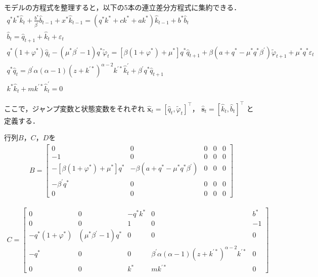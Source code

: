 \documentclass[dvipdfmx]{jlreq}
\begin{document}
モデルの方程式を整理すると，以下の5本の連立差分方程式に集約できる．
\begin{gather}
    q^* k^* \widehat{k}_t + \frac{b^*}{\beta^\prime} \widehat{b}_{t-1} + x^* \widehat{k}_{t-1} = (q^* k^* + c k^* + a k^*) \widehat{k}_{t-1} + b^* \widehat{b}_t \\
  \widehat{b}_t = \widehat{q}_{t+1} + \widehat{k}_t + \varepsilon_t \\
  q^*(1+\varphi^*) \widehat{q}_t - (\mu^* \beta^\prime - 1)q^* \widetilde{\varphi}_t = [\beta(1+\varphi^*) + \mu^*] q^* \widehat{q}_{t+1} + \beta(a+q^* - \mu^* q^* \beta^\prime) \widetilde{\varphi}_{t+1} + \mu^* q^* \varepsilon_t \\
  q^* \widehat{q}_t = \beta^\prime \alpha(\alpha-1)(z+k^{\prime *})^{\alpha-2} k^{\prime *} \widehat{k}^\prime_t + \beta^\prime q^* \widehat{q}_{t+1} \\
  k^* \widehat{k}_t + m k^{\prime *} \widehat{k}^\prime_t = 0
\end{gather}

ここで，ジャンプ変数と状態変数をそれぞれ
$\widehat{\boldsymbol{x}}_t = [\widehat{q}_t, \widetilde{\varphi}_t]^\top$，
$\widehat{\boldsymbol{s}}_t = [\widehat{k}_t, \widehat{b}_t]^\top$
と定義する．

行列$B$，$C$，$D$を
\begin{align}
  B =
  \begin{bmatrix}
    0 & 0 & 0 & 0 & 0 \\
    -1 & 0 & 0 & 0 & 0 \\
    -[\beta(1+\varphi^*) + \mu^*] q^* & -\beta (a + q^* - \mu^* q^* \beta^\prime) & 0 & 0 & 0 \\
    -\beta^\prime q^* & 0 & 0 & 0 & 0 \\
    0 & 0 & 0 & 0 & 0
  \end{bmatrix}
\end{align}

\begin{align}
  C =
  \begin{bmatrix}
    0 & 0 & -q^*k^* & 0 & b^* \\
    0 & 0 & 1 & 0 & -1 \\
    -q^*(1+\varphi^*) & (\mu^* \beta^\prime - 1)q^* & 0 & 0 & 0 \\
    -q^* & 0 & 0 & \beta^\prime \alpha(\alpha-1)(z+k^{\prime *})^{\alpha-2} k^{\prime *} & 0 \\
    0 & 0 & k^* & m k^{\prime *} & 0
  \end{bmatrix}
\end{align}
\end{document}
